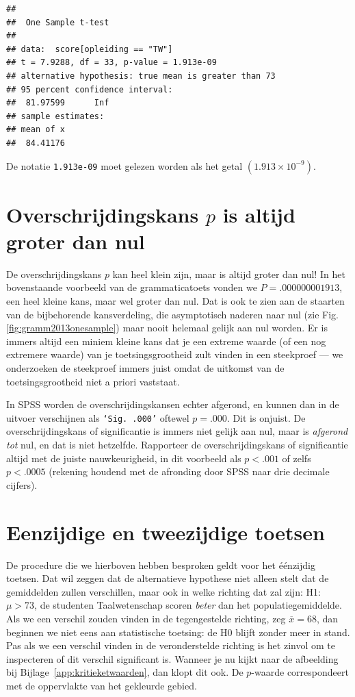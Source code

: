 \documentclass[
]{book}
\begin{document}
\begin{verbatim}
## 
##  One Sample t-test
## 
## data:  score[opleiding == "TW"]
## t = 7.9288, df = 33, p-value = 1.913e-09
## alternative hypothesis: true mean is greater than 73
## 95 percent confidence interval:
##  81.97599      Inf
## sample estimates:
## mean of x 
##  84.41176
\end{verbatim}

De notatie \texttt{1.913e-09} moet gelezen worden als het getal
\((1.913 \times 10^{-9})\).

\hypertarget{sec:pgroterdannul}{%
\section{\texorpdfstring{Overschrijdingskans \(p\) is altijd groter dan nul}{Overschrijdingskans p is altijd groter dan nul}}\label{sec:pgroterdannul}}

De overschrijdingskans \(p\) kan heel klein zijn, maar is altijd groter
dan nul! In het bovenstaande voorbeeld van de grammaticatoets
vonden we \(P=.000000001913\), een heel kleine kans, maar wel groter dan
nul. Dat is ook te zien aan de staarten van de bijbehorende
kansverdeling, die asymptotisch naderen naar nul (zie
Fig.\ref{fig:gramm2013onesample}) maar nooit helemaal gelijk aan nul
worden. Er is immers altijd een miniem kleine kans dat je een extreme
waarde (of een nog extremere waarde) van je toetsingsgrootheid zult
vinden in een steekproef --- we onderzoeken de steekproef immers juist
omdat de uitkomst van de toetsingsgrootheid niet a priori vaststaat.

In SPSS worden de overschrijdingskansen echter afgerond, en kunnen dan
in de uitvoer verschijnen als \texttt{‘Sig.\ .000’} oftewel \(p=.000\). Dit is
onjuist. De overschrijdingskans of significantie is immers niet gelijk
aan nul, maar is \emph{afgerond tot} nul, en dat is niet hetzelfde.
Rapporteer de overschrijdingskans of significantie altijd met de juiste
nauwkeurigheid, in dit voorbeeld als \(p<.001\) of zelfs \(p<.0005\)
(rekening houdend met de afronding door SPSS naar drie decimale
cijfers).

\hypertarget{sec:ttoets-eenzijdigtweezijdig}{%
\section{Eenzijdige en tweezijdige toetsen}\label{sec:ttoets-eenzijdigtweezijdig}}

De procedure die we hierboven hebben besproken geldt voor het éénzijdig
toetsen. Dat wil zeggen dat de alternatieve hypothese niet alleen stelt
dat de gemiddelden zullen verschillen, maar ook in welke richting dat
zal zijn: H1: \(\mu >73\), de studenten Taalwetenschap scoren \emph{beter} dan
het populatiegemiddelde. Als we een verschil zouden vinden in de
tegengestelde richting, zeg \(\overline{x}=68\), dan beginnen we niet eens
aan statistische toetsing: de H0 blijft zonder meer in stand. Pas als we
een verschil vinden in de veronderstelde richting is het zinvol om te
inspecteren of dit verschil significant is. Wanneer je nu kijkt naar de
afbeelding bij
Bijlage~\ref{app:kritieketwaarden}, dan klopt dit ook. De \(p\)-waarde
correspondeert met de oppervlakte van het gekleurde gebied.
\end{document}

